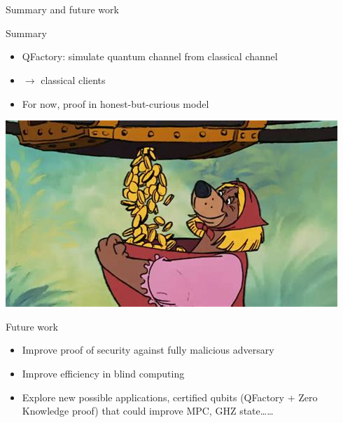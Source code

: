 \documentclass[table]{beamer}
\begin{document}
\section{}
\begin{frame}{Summary and future work}
  \begin{block}{Summary}
    \begin{minipage}{.6\linewidth}
      \begin{itemize}
      \item QFactory: simulate quantum channel from classical channel
      \item {} $\rightarrow$ classical clients
      \item For now, proof in honest-but-curious model
      \end{itemize}      
    \end{minipage}%
    \begin{minipage}{.4\linewidth}
      \includegraphics[width=\textwidth]{figures/money_fille.jpeg}        
    \end{minipage}
  \end{block}
  \begin{exampleblock}{Future work}
    \begin{itemize}
    \item Improve proof of security against fully malicious adversary
    \item Improve efficiency in blind computing
    \item Explore new possible applications, certified qubits (QFactory + Zero Knowledge proof) that could improve MPC, GHZ state\dots\dots
    \end{itemize}
  \end{exampleblock}
\end{frame}

\end{document}
